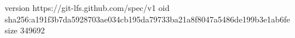 version https://git-lfs.github.com/spec/v1
oid sha256:a191f3b7da5928703ae034cb195da79733ba21a8f8047a5486de199b3e1ab6fe
size 349692
